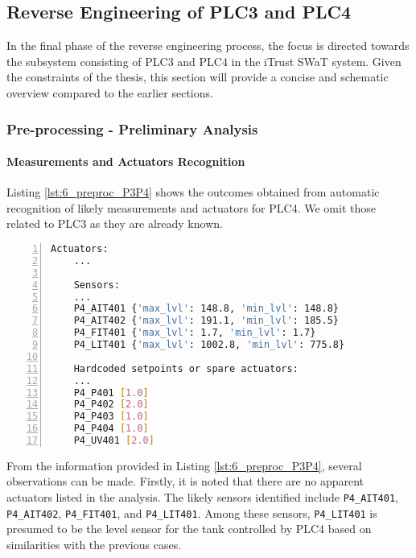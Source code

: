 \subsection{Reverse Engineering of PLC3 and PLC4}
\label{subsec:6_P3P4_analysis}
In the final phase of the reverse engineering process, the focus is directed towards the subsystem consisting of PLC3 and PLC4 in the iTrust SWaT system. Given the constraints of the thesis, this section will provide a concise and schematic overview compared to the earlier sections.

\subsubsection{Pre-processing - Preliminary Analysis}
\label{subsubsec:6_P3P4_preprocessing}

\paragraph{Measurements and Actuators Recognition}
\label{par:6_P3P4_measures_actuators_recognition}

Listing \ref{lst:6_preproc_P3P4} shows the outcomes obtained from automatic recognition of likely measurements and actuators for PLC4. We omit those related to PLC3 as they are already known.

\begin{lstlisting}[language=bash, numbers=left, caption=Preliminary analysis outcomes for sensors and actuators of \texttt{PLC3-4}, label=lst:6_preproc_P3P4]
	Actuators: 
	...
	
	Sensors: 
	...
	P4_AIT401 {'max_lvl': 148.8, 'min_lvl': 148.8}
	P4_AIT402 {'max_lvl': 191.1, 'min_lvl': 185.5}
	P4_FIT401 {'max_lvl': 1.7, 'min_lvl': 1.7}
	P4_LIT401 {'max_lvl': 1002.8, 'min_lvl': 775.8}
	
	Hardcoded setpoints or spare actuators: 
	...
	P4_P401 [1.0]
	P4_P402 [2.0]
	P4_P403 [1.0]
	P4_P404 [1.0]
	P4_UV401 [2.0]
\end{lstlisting}

From the information provided in Listing \ref{lst:6_preproc_P3P4}, several observations can be made. Firstly, it is noted that there are no apparent actuators listed in the analysis. The likely sensors identified include \texttt{P4\_AIT401}, \texttt{P4\_AIT402}, \texttt{P4\_FIT401}, and \texttt{P4\_LIT401}. Among these sensors, \texttt{P4\_LIT401} is presumed to be the level sensor for the tank controlled by PLC4 based on similarities with the previous cases.

